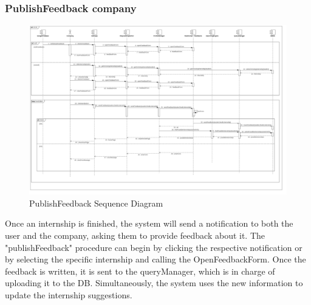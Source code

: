 \documentclass{article}
\begin{document}
\subsubsection{PublishFeedback company}
\begin{figure}[H]
    \centering
    \includegraphics[width=1\linewidth]{SequenceDiagram/UC16.jpg}
    \caption{PublishFeedback  Sequence Diagram}
    \label{fig:enter-label}
\end{figure}
Once an internship is finished, the system will send a notification to both the user and the company, asking them to provide feedback about it. The "publishFeedback" procedure can begin by clicking the respective notification or by selecting the specific internship and calling the OpenFeedbackForm. Once the feedback is written, it is sent to the queryManager, which is in charge of uploading it to the DB. Simultaneously, the system uses the new information to update the internship suggestions.
\end{document}
